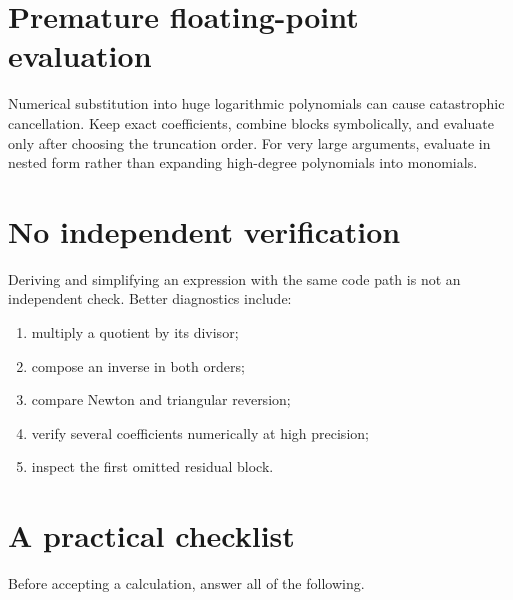 \documentclass[11pt,oneside]{book}
\theoremstyle{definition}
\theoremstyle{remark}
\begin{document}
\section{Premature floating-point evaluation}
Numerical substitution into huge logarithmic polynomials can cause
catastrophic cancellation. Keep exact coefficients, combine blocks
symbolically, and evaluate only after choosing the truncation order.
For very large arguments, evaluate in nested form rather than expanding
high-degree polynomials into monomials.

\section{No independent verification}
Deriving and simplifying an expression with the same code path is not an
independent check. Better diagnostics include:
\begin{enumerate}
\item multiply a quotient by its divisor;
\item compose an inverse in both orders;
\item compare Newton and triangular reversion;
\item verify several coefficients numerically at high precision;
\item inspect the first omitted residual block.
\end{enumerate}

\section{A practical checklist}
Before accepting a calculation, answer all of the following.
\end{document}
